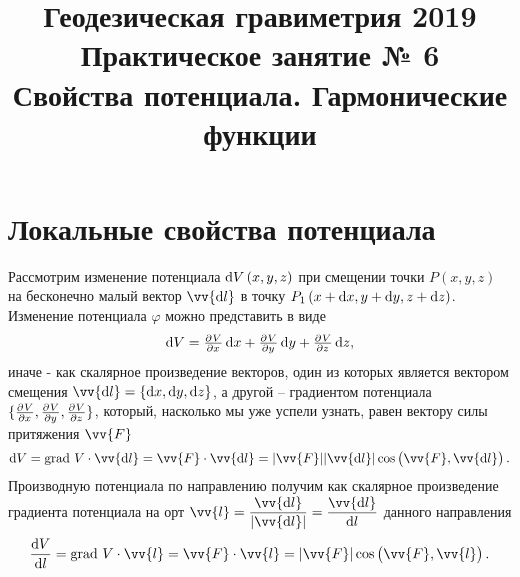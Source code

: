\documentclass[11pt, a4paper]{article}
\title{{\Large Геодезическая гравиметрия 2019}\\ 
    {\bf\Large Практическое занятие № 6} \\
{\Large Свойства потенциала. Гармонические функции}}
\author{}
\date{\DTMusedate{lessondate}}
\theoremstyle{plain}
\theoremstyle{definition}
\theoremstyle{remark}
\renewcommand{\phi}{\ensuremath{\varphi}}
\begin{document}
\maketitle
\section{Локальные свойства потенциала}
Рассмотрим изменение потенциала $\dif V \left(x, y, z\right)$ при смещении точки $P\left( x, y,z \right)$ на бесконечно малый вектор $\vv{\dif l}$ в точку $P_1\left( x + \dif x, y + \dif y, z + \dif z \right)$.
Изменение потенциала $\phi$ можно представить в виде
\begin{equation*}
    \dif V = \pd{V}{x}\dif x + \pd{V}{y}\dif y + \pd{V}{z}\dif z, 
\end{equation*}
иначе - как скалярное произведение векторов, один из которых является вектором смещения $\vv{\dif l} = \{\dif x, \dif y, \dif z\}$, а другой – градиентом потенциала $\{\pd{V}{x}, \pd{V}{y}, \pd{V}{z}\}$, который, насколько мы уже успели узнать, равен вектору силы притяжения $\vv{F}$
\begin{equation*}
    \dif V = \text{grad } V \cdot \vv{\dif l} = \vv{F} \cdot \vv{\dif l} = |\vv{F}| |\vv{\dif l}| \cos \left(\vv{F}, \vv{\dif l}\right).
\end{equation*}
Производную потенциала по направлению получим как скалярное произведение градиента потенциала на орт $\vv{l} = \dfrac{\vv{\dif l}}{|\vv{\dif l}|} = \dfrac{\vv{\dif l}}{\dif l}$ данного направления 
\begin{equation}
    \dfrac{\dif V}{\dif l} = \text{grad } V \cdot \vv{l} = \vv{F} \cdot \vv{l} = | \vv{F}| \cos \left(\vv{F}, \vv{l}\right).
\end{equation}
\end{document}
